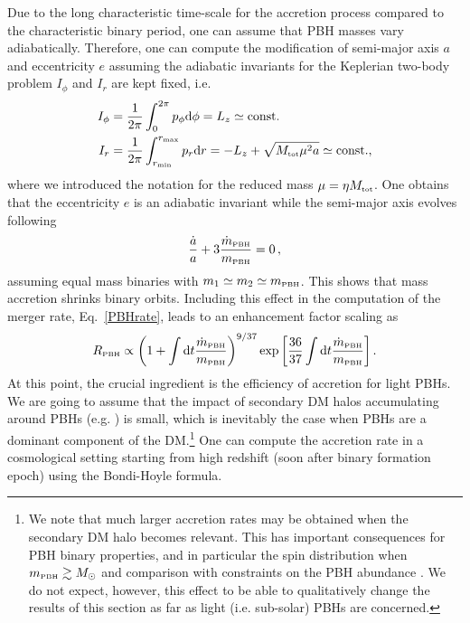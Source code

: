 \documentclass[11pt,a4paper]{article}
\newcommand{\be}{\begin{equation}}
\newcommand{\ee}{\end{equation}}
\renewcommand{\d}{{\rm d}}
\newcommand{\lp }{\left (}
\newcommand{\llp }{\left [}
\newcommand{\rp }{\right )}
\newcommand{\rrp }{\right ]}
\newcommand{\PBH}{\text{\tiny PBH}}
\begin{document}
Due to the long characteristic time-scale for the accretion process compared to the characteristic binary period, one can assume that PBH masses vary adiabatically. 
Therefore, one can compute the modification of semi-major axis $a$ and eccentricity $e$ assuming 
the adiabatic invariants for the Keplerian two-body problem $I_\phi$ and $I_r $ are kept fixed, i.e.~\cite{landau1976mechanics}
\begin{align}
	I_\phi &= \frac{1}{2\pi} \int_0^{2\pi} p_\phi \d \phi = L_z \simeq \text{const.}  \\
	I_r &=  \frac{1}{2\pi} \int_{r_{\rm min}}^{r_{\rm max}} p_r \d r  = - L_z + \sqrt{M_\text{\tiny tot} \mu^2 a} \simeq \text{const.},
\end{align}
where we introduced the notation for the reduced mass $\mu = \eta M_\text{\tiny tot}$.
One obtains that the eccentricity $e$ is an adiabatic invariant while the semi-major axis evolves following
\be
\frac{\dot a}{a} + 3\frac{\dot m_\PBH}{m_\PBH} =0\,,
\ee
assuming equal mass binaries with $m_1 \simeq m_2 \simeq m_\PBH$. 
This shows that mass accretion shrinks binary orbits. 
Including this effect in the computation of the merger rate, Eq.~\eqref{PBHrate}, leads to an enhancement factor scaling as  \cite{DeLuca:2020qqa}
\begin{equation}\label{rateaccretionPBHbin}
R_\text{\tiny PBH} \propto
\lp 1 + \int \d t \frac{\dot m_\PBH}{m_\PBH} \rp^{9/37} 
\exp\llp \frac{36}{37} \int \d t \frac{\dot m_\PBH}{m_\PBH}
\rrp.
\end{equation}
At this point, the crucial ingredient is the efficiency of accretion for light PBHs. 
We are going to assume that the impact of secondary DM halos accumulating around PBHs (e.g. \cite{Ricotti:2007au,Ricotti:2007jk,Adamek:2019gns,DeLuca:2020qqa}) is small, 
which is inevitably the case when PBHs are a dominant component of the DM.\footnote{We note that much larger accretion rates may be obtained when the secondary DM halo becomes relevant. 
This has important consequences for PBH binary properties, and in particular the spin distribution when $m_\PBH \gtrsim M_\odot$ \cite{DeLuca:2020bjf,Franciolini:2021xbq,Franciolini:2022iaa} and comparison with constraints on the PBH abundance \cite{DeLuca:2020fpg,DeLuca:2020sae}.
We do not expect, however, this effect to be able to qualitatively change the results of this section as far as light (i.e. sub-solar) PBHs are concerned.
}
One can compute the accretion rate in a cosmological setting starting from high redshift (soon after binary formation epoch) using the Bondi-Hoyle formula.
\end{document}
